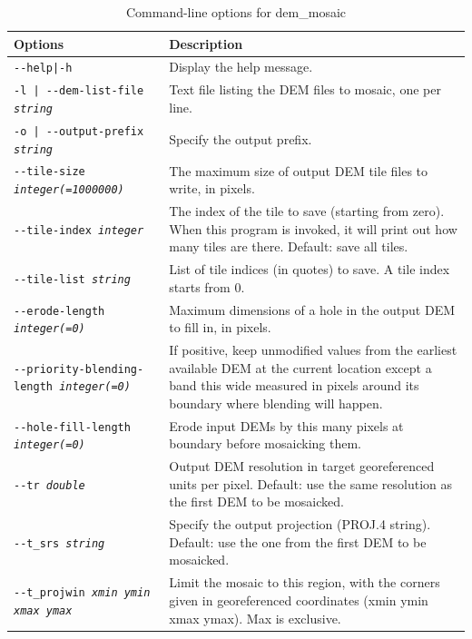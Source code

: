 \begin{longtable}{|l|p{10cm}|}
\caption{Command-line options for dem\_mosaic}
\label{tbl:demmosaic}
\endfirsthead
\endhead
\endfoot
\endlastfoot
\hline
Options & Description \\
\hline \hline

\texttt{-\/-help|-h} & Display the help message.\\ \hline
\texttt{-l | -\/-dem-list-file \textit{string}}  &
Text file listing the DEM files to mosaic, one per line.
\\ \hline
\texttt{-o | -\/-output-prefix  \textit{string} } &
Specify the output prefix.
\\ \hline
\texttt{-\/-tile-size \textit{integer(=1000000)}} &
The maximum size of output DEM tile files to write, in pixels.
\\ \hline
\texttt{-\/-tile-index \textit{integer}} &
The index of the tile to save (starting from zero). When this program is invoked, it will print  out how many tiles are there. Default: save all tiles.
\\ \hline

\texttt{-\/-tile-list \textit{string}} &
List of tile indices (in quotes) to save. A tile index starts from 0.
\\ \hline

\texttt{-\/-erode-length \textit{integer(=0)} }  &
Maximum dimensions of a hole in the output DEM to fill in, in pixels.
\\ \hline

\texttt{-\/-priority-blending-length \textit{integer(=0)} }  &
If positive, keep unmodified values from the earliest available DEM at the current location except a band this wide measured in pixels around its boundary where blending will happen.
\\ \hline

\texttt{-\/-hole-fill-length \textit{integer(=0)} }  &
Erode input DEMs by this many pixels at boundary before mosaicking them.
\\ \hline

\texttt{-\/-tr \textit{double}  } &
Output DEM resolution in target georeferenced units per pixel. Default: use the same resolution as the first DEM to be mosaicked.
\\ \hline
\texttt{-\/-t\_srs \textit{string} } &
Specify the output projection (PROJ.4 string). Default: use the one from the first DEM to be mosaicked.
\\ \hline
\texttt{-\/-t\_projwin \textit{xmin ymin xmax ymax} } &
Limit the mosaic to this region, with the corners given in georeferenced coordinates (xmin ymin xmax ymax). Max is exclusive.
\\ \hline


\end{longtable}
